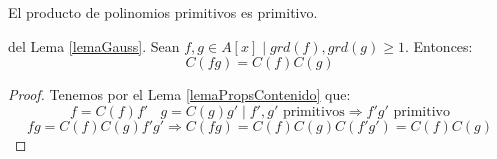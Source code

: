 \begin{lema}[de Gauss]
    \label{lemaGauss}
    El producto de polinomios primitivos es primitivo.
\end{lema}

\begin{coro}
    del Lema \ref{lemaGauss}.\newline
    Sean $f,g \in A[x] \mid grd(f),grd(g) \geq 1$. Entonces:
    $$C(fg)=C(f)C(g)$$
\begin{proof}
    Tenemos por el Lema \ref{lemaPropsContenido} que:
    $$f = C(f)f'~~~~g=C(g)g' \mid f',g' \mbox{ primitivos} \Rightarrow f'g' \mbox{ primitivo}$$
    $$fg = C(f)C(g)f'g' \Rightarrow C(fg) = C(f)C(g)C(f'g') = C(f)C(g)$$
\end{proof}
\end{coro}


